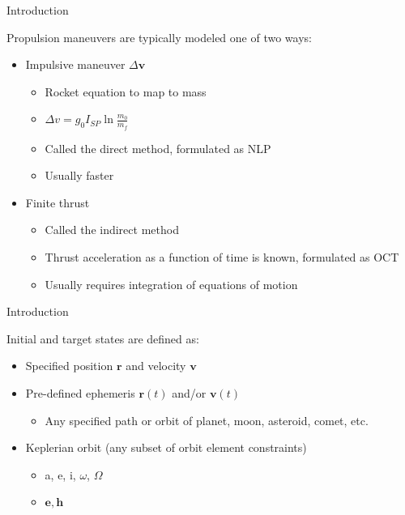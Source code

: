 \begin{frame}{Introduction}

    Propulsion maneuvers are typically modeled one of two ways: 
    \begin{itemize}
        \item Impulsive maneuver $ \Delta \mathbf{v} $ 
        \begin{itemize}
            \item Rocket equation to map to mass 
            \item $ \Delta v = g_0 I_{SP} \operatorname{ln} \frac{ m_0 }{ m_f } $
            \item Called the direct method, formulated as NLP  
            \item Usually faster 
        \end{itemize}
        \item Finite thrust  
        \begin{itemize}
            \item Called the indirect method 
            \item Thrust acceleration as a function of time is known, formulated as OCT 
            \item Usually requires integration of equations of motion 
        \end{itemize}
    \end{itemize}
    
\end{frame} 

\begin{frame}{Introduction} 

    Initial and target states are defined as: 

    \begin{itemize}
        \item Specified position $\mathbf{r}$ and velocity $\mathbf{v}$ 
        \item Pre-defined ephemeris $\mathbf{r}(t)$ and/or $\mathbf{v}(t)$ 
        \begin{itemize}
            \item Any specified path or orbit of planet, moon, asteroid, comet, etc. 
        \end{itemize} 
        \item Keplerian orbit (any subset of orbit element constraints) 
        \begin{itemize}
            \item a, e, i, $\omega$, $\Omega$ 
            \item $ \mathbf{e}, \mathbf{h} $
        \end{itemize}
    \end{itemize}
    
\end{frame} 


